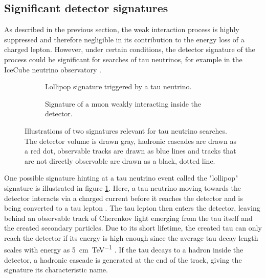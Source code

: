 \subsection{Significant detector signatures}
\label{sec:weak_signature}

As described in the previous section, the weak interaction process is highly suppressed and therefore negligible in its contribution to the energy loss of a charged lepton.
However, under certain conditions, the detector signature of the process could be significant for searches of tau neutrinos, for example in the IceCube neutrino observatory \cite{Sandrock:2018hpj}.

\begin{figure}
    \centering
    \begin{subfigure}{0.46\textwidth}
        \centering
        
        \caption{Lollipop signature triggered by a tau neutrino.}
        \label{fig:lollipop_signature}
    \end{subfigure}%
    \hspace{0.06\textwidth}%
    \begin{subfigure}{0.46\textwidth}
        \centering
        
        \caption{Signature of a muon weakly interacting inside the detector.}
        \label{fig:weak_signature}
    \end{subfigure}
    \caption{Illustrations of two signatures relevant for tau neutrino searches. The detector volume is drawn gray, hadronic cascades are drawn as a red dot, observable tracks are drawn as blue lines and tracks that are not directly observable are drawn as a black, dotted line.}
    \label{fig:test}
\end{figure}

One possible signature hinting at a tau neutrino event called the "lollipop" signature is illustrated in figure \ref{fig:lollipop_signature}.
Here, a tau neutrino moving towards the detector interacts via a charged current before it reaches the detector and is being converted to a tau lepton \cite{Cowen_2007}.
The tau lepton then enters the detector, leaving behind an observable track of Cherenkov light emerging from the tau itself and the created secondary particles.
Due to its short lifetime, the created tau can only reach the detector if its energy is high enough since the average tau decay length scales with energy as \SI{5}{\cm\per\tera\electronvolt} \cite{Aartsen_2016}.
If the tau decays to a hadron inside the detector, a hadronic cascade is generated at the end of the track, giving the signature its characteristic name. 

